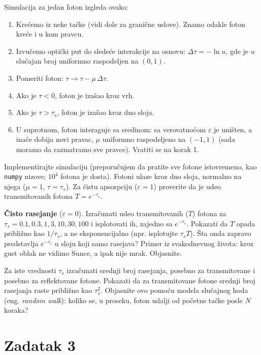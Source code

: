 \documentclass[12pt]{article}
\begin{document}
Simulacija za jedan foton izgleda ovako:
\begin{enumerate}
    \item Kre\'{c}emo iz neke ta\v{c}ke (vidi dole za grani\v{c}ne uslove). Znamo odakle foton kre\'{c}e i u kom pravcu.
    \item Izvu\v{c}emo opti\v{c}ki put do slede\'{c}e interakcije na osnovu: $\Delta\tau = -\ln u$, gde je $u$ slu\v{c}ajan broj uniformno raspodeljen na $(0,1)$.
    \item Pomeriti foton: $\tau \rightarrow \tau - \mu\,\Delta\tau$.
    \item Ako je $\tau < 0$, foton je iza\v{s}ao kroz vrh.
    \item Ako je $\tau > \tau_s$, foton je iza\v{s}ao kroz dno sloja.
    \item U suprotnom, foton interaguje sa sredinom: sa verovatno\'{c}om $\varepsilon$ je uni\v{s}ten, a ina\v{c}e dobija novi pravac, $\mu$ uniformno raspodeljeno na $(-1,1)$ (sada moramo da razmatramo sve pravce). Vratiti se na korak 1.
\end{enumerate}

Implementirajte simulaciju (preporu\v{c}ujem da pratite sve fotone istovremeno, kao \texttt{numpy} nizove; $10^4$ fotona je dosta). Fotoni ulaze kroz dno sloja, normalno na njega ($\mu=1$, $\tau = \tau_s$). Za \v{c}istu apsorpciju ($\varepsilon=1$) proverite da je udeo transmitovanih fotona $T = e^{-\tau_s}$.

\textbf{\v{C}isto rasejanje} ($\varepsilon = 0$). Izra\v{c}unati udeo transmitovanih ($T$) fotona za $\tau_s = 0.1, 0.3, 1, 3, 10, 30, 100$ i isplotovati ih, zajedno sa $e^{-\tau_s}$. Pokazati da $T$ opada pribli\v{z}no kao $1/\tau_s$, a ne eksponencijalno (npr. isplotujte $\tau_s T$). \v{S}ta onda zapravo predstavlja $e^{-\tau_s}$ u sloju koji samo rasejava? Primer iz svakodnevnog \v{z}ivota: kroz gust oblak ne vidimo Sunce, a ipak nije mrak. Objasnite.

Za iste vrednosti $\tau_s$ izra\v{c}unati srednji broj rasejanja, posebno za transmitovane i posebno za reflektovane fotone. Pokazati da za transmitovane fotone srednji broj rasejanja raste pribli\v{z}no kao $\tau_s^2$. Objasnite ovo pomo\'{c}u modela slu\v{c}ajnog hoda (eng. \emph{random walk}): koliko se, u proseku, foton udalji od po\v{c}etne ta\v{c}ke posle $N$ koraka?

\section*{Zadatak 3}
\end{document}
